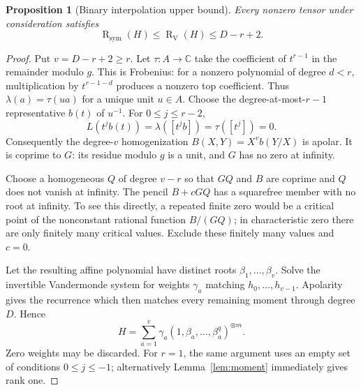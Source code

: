 \documentclass[11pt]{article}
\newtheorem{proposition}[theorem]{Proposition}
\theoremstyle{definition}
\theoremstyle{remark}
\newcommand{\C}{\mathbb C}
\newcommand{\SR}{\operatorname{R}_{\mathrm{sym}}}
\newcommand{\VR}{\operatorname{R}_{\mathrm V}}
\begin{document}
\begin{proposition}[Binary interpolation upper bound]\label{prop:binaryupper}
Every nonzero tensor under consideration satisfies
\begin{equation}\label{eq:binaryupper}
 \SR(H)\le\VR(H)\le D-r+2.
\end{equation}
\end{proposition}
\begin{proof}
Put $v=D-r+2\ge r$. Let $\tau:A\to\C$ take the coefficient of $t^{r-1}$
in the remainder modulo $g$. This is Frobenius: for a nonzero polynomial of
degree $d<r$, multiplication by $t^{r-1-d}$ produces a nonzero top coefficient.
Thus $\lambda(a)=\tau(ua)$ for a unique unit $u\in A$.
Choose the degree-at-most-$r-1$ representative $b(t)$ of $u^{-1}$.
For $0\le j\le r-2$,
\[
 L(t^j b(t))=\lambda([t^j b])=\tau([t^j])=0.
\]
Consequently the degree-$v$ homogenization $B(X,Y)=X^v b(Y/X)$ is apolar.
It is coprime to $G$: its residue modulo $g$ is a unit, and $G$ has no zero
at infinity.

Choose a homogeneous $Q$ of degree $v-r$ so that $GQ$ and $B$ are coprime
and $Q$ does not vanish at infinity. The pencil
$B+cGQ$ has a squarefree member with no root at infinity. To see this directly,
a repeated finite zero would be a critical point of the nonconstant rational
function $B/(GQ)$; in characteristic zero there are only finitely many
critical values. Exclude these finitely many values and $c=0$.

Let the resulting affine polynomial have distinct roots
$\beta_1,\ldots,\beta_v$. Solve the invertible Vandermonde system for weights
$\gamma_a$ matching $h_0,\ldots,h_{v-1}$. Apolarity gives the recurrence
which then matches every remaining moment through degree $D$. Hence
\[
 H=\sum_{a=1}^v\gamma_a(1,\beta_a,\ldots,\beta_a^q)^{\otimes m}.
\]
Zero weights may be discarded. For $r=1$, the same argument uses an empty
set of conditions $0\le j\le-1$; alternatively Lemma~\ref{lem:moment}
immediately gives rank one.
\end{proof}
\end{document}
